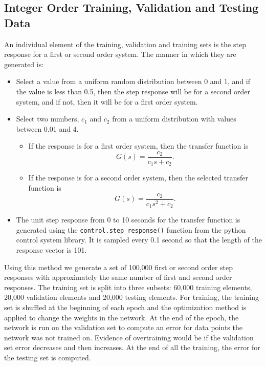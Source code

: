 \subsection{Integer Order Training, Validation and Testing Data}

  An individual element of the training, validation and training sets is the
  step response for a first or second order system. The manner in which they
  are generated is:

  \begin{itemize}

    \item Select a value from a uniform random distribution between 0 and 1, and
    if the value is less than 0.5, then the step response will be for a second
    order system, and if not, then it will be for a first order system.

    \item Select two numbers, $c_1$ and $c_2$ from a uniform distribution with
    values between 0.01 and 4.

    \begin{itemize}

      \item If the response is for a first order system, then the transfer
      function is
      \[
        G(s) = \frac{c_2}{c_1 s + c_2}.
      \]

      \item If the response is for a second order system, then the selected
      transfer function is
      \[
        G(s) = \frac{c_2}{c_1 s^2 + c_2}.
      \]

    \end{itemize}

    \item The unit step response from 0 to 10 seconds for the transfer function
    is generated using the \texttt{control.step\_response()} function from the
    python control system library. It is sampled every 0.1 second so that the
    length of the response vector is 101.

\end{itemize} 

    Using this method we generate a set of 100,000 first or second order step
    responses with approximately the same number of first and second order
    responses. The training set is split into three subsets: 60,000 training
    elements, 20,000 validation elements and 20,000 testing elements. For
    training, the training set is shuffled at the beginning of each epoch and
    the optimization method is applied to change the weights in the network.  At
    the end of the epoch, the network is run on the validation set to compute an
    error for data points the network was not trained on. Evidence of
    overtraining would be if the validation set error decreases and then
    increases.  At the end of all the training, the error for the testing set is
    computed.

